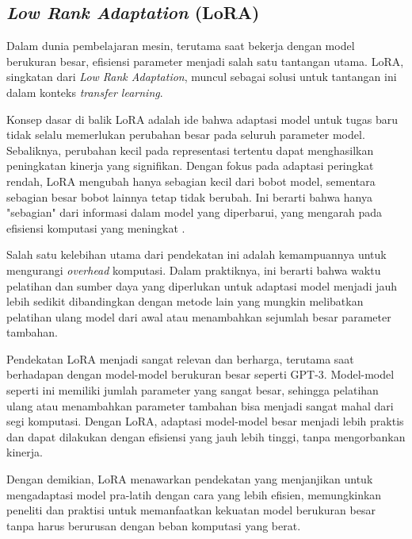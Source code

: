 \subsection{\textit{Low Rank Adaptation} (LoRA)}

Dalam dunia pembelajaran mesin, terutama saat bekerja dengan model berukuran besar, efisiensi parameter menjadi salah satu tantangan utama. LoRA, singkatan dari \textit{Low Rank Adaptation}, muncul sebagai solusi untuk tantangan ini dalam konteks \textit{transfer learning}.

Konsep dasar di balik LoRA adalah ide bahwa adaptasi model untuk tugas baru tidak selalu memerlukan perubahan besar pada seluruh parameter model. Sebaliknya, perubahan kecil pada representasi tertentu dapat menghasilkan peningkatan kinerja yang signifikan. Dengan fokus pada adaptasi peringkat rendah, LoRA mengubah hanya sebagian kecil dari bobot model, sementara sebagian besar bobot lainnya tetap tidak berubah. Ini berarti bahwa hanya "sebagian" dari informasi dalam model yang diperbarui, yang mengarah pada efisiensi komputasi yang meningkat \parencite{lora}.

Salah satu kelebihan utama dari pendekatan ini adalah kemampuannya untuk mengurangi \textit{overhead} komputasi. Dalam praktiknya, ini berarti bahwa waktu pelatihan dan sumber daya yang diperlukan untuk adaptasi model menjadi jauh lebih sedikit dibandingkan dengan metode lain yang mungkin melibatkan pelatihan ulang model dari awal atau menambahkan sejumlah besar parameter tambahan.

Pendekatan LoRA menjadi sangat relevan dan berharga, terutama saat berhadapan dengan model-model berukuran besar seperti GPT-3. Model-model seperti ini memiliki jumlah parameter yang sangat besar, sehingga pelatihan ulang atau menambahkan parameter tambahan bisa menjadi sangat mahal dari segi komputasi. Dengan LoRA, adaptasi model-model besar menjadi lebih praktis dan dapat dilakukan dengan efisiensi yang jauh lebih tinggi, tanpa mengorbankan kinerja.

Dengan demikian, LoRA menawarkan pendekatan yang menjanjikan untuk mengadaptasi model pra-latih dengan cara yang lebih efisien, memungkinkan peneliti dan praktisi untuk memanfaatkan kekuatan model berukuran besar tanpa harus berurusan dengan beban komputasi yang berat.